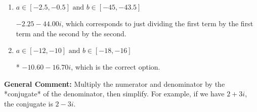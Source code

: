 \documentclass{extbook}[14pt]
\begin{document}
\begin{enumerate}
{\begin{enumerate}[label=\Alph*.]
 $-212.00  - 16.70 i$, which corresponds to forgetting to multiply the conjugate by the numerator and using a plus instead of a minus in the denominator.
\item \( a \in [-2.5, -0.5] \text{ and } b \in [-45, -43.5] \)

 $-2.25  - 44.00 i$, which corresponds to just dividing the first term by the first term and the second by the second.
\item \( a \in [-12, -10] \text{ and } b \in [-18, -16] \)

* $-10.60  - 16.70 i$, which is the correct option.
\end{enumerate}

\textbf{General Comment:} Multiply the numerator and denominator by the *conjugate* of the denominator, then simplify. For example, if we have $2+3i$, the conjugate is $2-3i$.
}
\end{enumerate}
\end{document}
